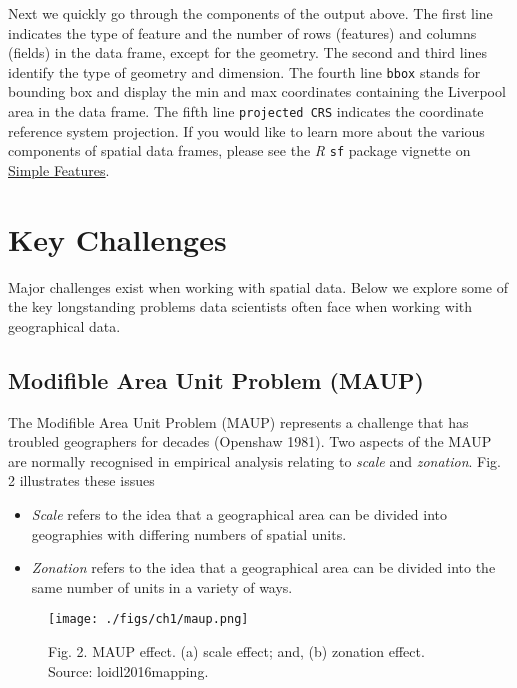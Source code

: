\documentclass[
  letterpaper,
  krantz2]{style/krantz}
\begin{document}
Next we quickly go through the components of the output above. The first
line indicates the type of feature and the number of rows (features) and
columns (fields) in the data frame, except for the geometry. The second
and third lines identify the type of geometry and dimension. The fourth
line \texttt{bbox} stands for bounding box and display the min and max
coordinates containing the Liverpool area in the data frame. The fifth
line \texttt{projected\ CRS} indicates the coordinate reference system
projection. If you would like to learn more about the various components
of spatial data frames, please see the \emph{R} \texttt{sf} package
vignette on
\href{https://r-spatial.github.io/sf/articles/sf1.html}{Simple
Features}.

\hypertarget{key-challenges}{%
\section{Key Challenges}\label{key-challenges}}

Major challenges exist when working with spatial data. Below we explore
some of the key longstanding problems data scientists often face when
working with geographical data.

\hypertarget{modifible-area-unit-problem-maup}{%
\subsection{Modifible Area Unit Problem
(MAUP)}\label{modifible-area-unit-problem-maup}}

The Modifible Area Unit Problem (MAUP) represents a challenge that has
troubled geographers for decades (Openshaw 1981). Two aspects of the
MAUP are normally recognised in empirical analysis relating to
\emph{scale} and \emph{zonation}. Fig. 2 illustrates these issues

\begin{itemize}
\item
  \emph{Scale} refers to the idea that a geographical area can be
  divided into geographies with differing numbers of spatial units.
\item
  \emph{Zonation} refers to the idea that a geographical area can be
  divided into the same number of units in a variety of ways.
\end{itemize}

\begin{figure}

{\centering \texttt{[image: ./figs/ch1/maup.png]}

}

\caption{Fig. 2. MAUP effect. (a) scale effect; and, (b) zonation
effect. Source: loidl2016mapping.}

\end{figure}
\end{document}
